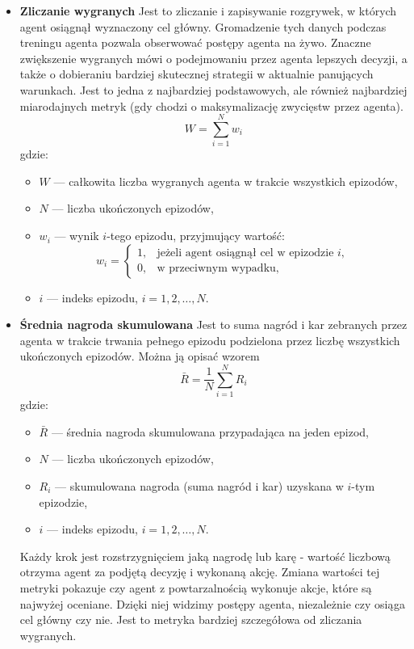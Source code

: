 \documentclass{iiuwb}
\begin{document}
\begin{itemize}
\item \textbf{Zliczanie wygranych}
Jest to zliczanie i zapisywanie rozgrywek, w których agent osiągnął wyznaczony cel główny. Gromadzenie tych danych podczas treningu agenta pozwala obserwować postępy agenta na żywo. Znaczne zwiększenie wygranych mówi o podejmowaniu przez agenta lepszych decyzji, a także o dobieraniu bardziej skutecznej strategii w aktualnie panujących warunkach. Jest to jedna z najbardziej podstawowych, ale również najbardziej miarodajnych metryk (gdy chodzi o maksymalizację zwycięstw przez agenta).  
\begin{equation}
{W} = \sum_{i=1}^{N} {w_i}
\end{equation}
\noindent
gdzie:
\begin{itemize}
    \item $W$ — całkowita liczba wygranych agenta w trakcie wszystkich epizodów,
    \item $N$ — liczba ukończonych epizodów,
    \item $w_i$ — wynik $i$-tego epizodu, przyjmujący wartość:
    \[
        w_i =
        \begin{cases}
        1, & \text{jeżeli agent osiągnął cel w epizodzie } i,\\
        0, & \text{w przeciwnym wypadku},
        \end{cases}
    \]
    \item $i$ — indeks epizodu, $i = 1,2,\dots,N$.
\end{itemize}

\item \textbf{Średnia nagroda skumulowana}
Jest to suma nagród i kar zebranych przez agenta w trakcie trwania pełnego epizodu podzielona przez liczbę wszystkich ukończonych epizodów. Można ją opisać wzorem
\begin{equation}
\bar{R} = \frac{1}{N} \sum_{i=1}^{N} R_i
\end{equation}
\noindent
gdzie:
\begin{itemize}
    \item $\bar{R}$ — średnia nagroda skumulowana przypadająca na jeden epizod,
    \item $N$ — liczba ukończonych epizodów,
    \item $R_i$ — skumulowana nagroda (suma nagród i kar) uzyskana w $i$-tym epizodzie,
    \item $i$ — indeks epizodu, $i = 1,2,\dots,N$.
\end{itemize}
Każdy krok jest rozstrzygnięciem jaką nagrodę lub karę - wartość liczbową otrzyma agent za podjętą decyzję i wykonaną akcję. Zmiana wartości tej metryki pokazuje czy agent z powtarzalnością wykonuje akcje, które są najwyżej oceniane. Dzięki niej widzimy postępy agenta, niezależnie czy osiąga cel główny czy nie. Jest to metryka bardziej szczegółowa od zliczania wygranych.


\end{itemize}
\end{document}
